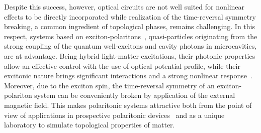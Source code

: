 \documentclass[
aps,
prl,
groupedaddress,
superscriptaddress,
floatfix,
notitlepage
]{revtex4-1}
\begin{document}
Despite this success, however, optical circuits are not well suited for nonlinear effects to be directly incorporated while realization of the time-reversal symmetry breaking, a common ingredient of topological phases, remains challenging. 
In this respect, systems based on exciton-polaritons~\cite{Carusotto2013}, quasi-particles originating from the strong coupling of the quantum well-excitons and cavity photons in microcavities, are at advantage. 
Being hybrid light-matter excitations, their photonic properties allow an effective control with the use of optical potential profile, while their excitonic nature brings significant interactions and a strong nonlinear response~\cite{CedraMendez2010,Kim2013,Jacqmin2014,Baboux2016}. 
Moreover, due to the exciton spin, the time-reversal symmetry of an exciton-polariton system can be conveniently broken by application of the external magnetic field. This makes polaritonic systems attractive both from the point of view of applications in prospective polaritonic devices~\cite{Liew2011,Sanvitto2016} and as a unique laboratory to simulate topological properties of matter.
\end{document}
